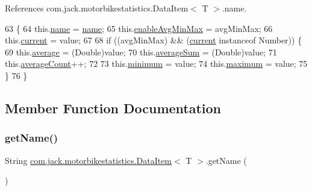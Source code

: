 References com.\+jack.\+motorbikestatistics.\+Data\+Item$<$ T $>$.\+name.


\begin{DoxyCode}
63                                                              \{
64         this.\hyperlink{classcom_1_1jack_1_1motorbikestatistics_1_1_data_item_a09f8b80430dc1620acbe3532d900fc5a}{name} = \hyperlink{classcom_1_1jack_1_1motorbikestatistics_1_1_data_item_a09f8b80430dc1620acbe3532d900fc5a}{name};
65         this.\hyperlink{classcom_1_1jack_1_1motorbikestatistics_1_1_data_item_a7cfeefe9064017755f8462421693d2a9}{enableAvgMinMax} = avgMinMax;
66         this.\hyperlink{classcom_1_1jack_1_1motorbikestatistics_1_1_data_item_a48cf1c273c44e2181a99d56c48868d1d}{current} = value;
67 
68         \textcolor{keywordflow}{if} ((avgMinMax) && (\hyperlink{classcom_1_1jack_1_1motorbikestatistics_1_1_data_item_a48cf1c273c44e2181a99d56c48868d1d}{current} instanceof Number)) \{
69             this.\hyperlink{classcom_1_1jack_1_1motorbikestatistics_1_1_data_item_a720fe4f7fa02578cc8e0a59ef784746d}{average} = (Double)value;
70             this.\hyperlink{classcom_1_1jack_1_1motorbikestatistics_1_1_data_item_ab1d6f0c800def7c32486e31e8195349e}{averageSum} = (Double)value;
71             this.\hyperlink{classcom_1_1jack_1_1motorbikestatistics_1_1_data_item_aaa50027610a16f6a373f0cd3f5a96333}{averageCount}++;
72 
73             this.\hyperlink{classcom_1_1jack_1_1motorbikestatistics_1_1_data_item_a770342aaa7248e9687517864d73f0009}{minimum} = value;
74             this.\hyperlink{classcom_1_1jack_1_1motorbikestatistics_1_1_data_item_ac1edb9c63224cebf789b7a2ffd45598f}{maximum} = value;
75         \}
76     \}
\end{DoxyCode}


\subsection{Member Function Documentation}
\mbox{\label{classcom_1_1jack_1_1motorbikestatistics_1_1_data_item_ae0beb1548c3ca85be62eb2e94e9def65}} 
\subsubsection{\texorpdfstring{get\+Name()}{getName()}}
{\footnotesize\ttfamily String \hyperlink{classcom_1_1jack_1_1motorbikestatistics_1_1_data_item}{com.\+jack.\+motorbikestatistics.\+Data\+Item}$<$ T $>$.get\+Name (\begin{DoxyParamCaption}{ }\end{DoxyParamCaption})\hspace{0.3cm}{\ttfamily [inline]}}



